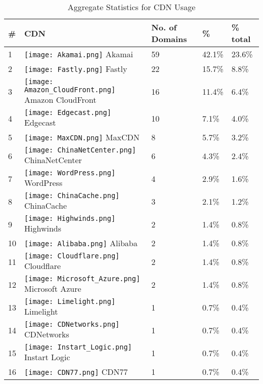 \begin{table}[]
\centering
\caption{Aggregate Statistics for CDN Usage}
\label{cdn-stats-table}
\begin{tabular}{|lllll|}
\hline
\# & CDN & No. of Domains & \% & \% total \\
\hline
1 & \texttt{[image: Akamai.png]} Akamai & 59 & 42.1\% & 23.6\%\\
2 & \texttt{[image: Fastly.png]} Fastly & 22 & 15.7\% & 8.8\%\\
3 & \texttt{[image: Amazon\_CloudFront.png]} Amazon CloudFront & 16 & 11.4\% & 6.4\%\\
4 & \texttt{[image: Edgecast.png]} Edgecast & 10 & 7.1\% & 4.0\%\\
5 & \texttt{[image: MaxCDN.png]} MaxCDN & 8 & 5.7\% & 3.2\%\\
6 & \texttt{[image: ChinaNetCenter.png]} ChinaNetCenter & 6 & 4.3\% & 2.4\%\\
7 & \texttt{[image: WordPress.png]} WordPress & 4 & 2.9\% & 1.6\%\\
8 & \texttt{[image: ChinaCache.png]} ChinaCache & 3 & 2.1\% & 1.2\%\\
9 & \texttt{[image: Highwinds.png]} Highwinds & 2 & 1.4\% & 0.8\%\\
10 & \texttt{[image: Alibaba.png]} Alibaba & 2 & 1.4\% & 0.8\%\\
11 & \texttt{[image: Cloudflare.png]} Cloudflare & 2 & 1.4\% & 0.8\%\\
12 & \texttt{[image: Microsoft\_Azure.png]} Microsoft Azure & 2 & 1.4\% & 0.8\%\\
13 & \texttt{[image: Limelight.png]} Limelight & 1 & 0.7\% & 0.4\%\\
14 & \texttt{[image: CDNetworks.png]} CDNetworks & 1 & 0.7\% & 0.4\%\\
15 & \texttt{[image: Instart\_Logic.png]} Instart Logic & 1 & 0.7\% & 0.4\%\\
16 & \texttt{[image: CDN77.png]} CDN77 & 1 & 0.7\% & 0.4\%\\
\hline
\end{tabular}
\end{table}

